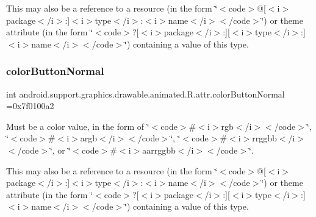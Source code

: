 This may also be a reference to a resource (in the form \char`\"{}$<$code$>$@\mbox{[}$<$i$>$package$<$/i$>$\+:\mbox{]}$<$i$>$type$<$/i$>$\+:$<$i$>$name$<$/i$>$$<$/code$>$\char`\"{}) or theme attribute (in the form \char`\"{}$<$code$>$?\mbox{[}$<$i$>$package$<$/i$>$\+:\mbox{]}\mbox{[}$<$i$>$type$<$/i$>$\+:\mbox{]}$<$i$>$name$<$/i$>$$<$/code$>$\char`\"{}) containing a value of this type. \mbox{\label{classandroid_1_1support_1_1graphics_1_1drawable_1_1animated_1_1R_1_1attr_a2c2682599083668662dd93ec8e0b2240}} 
\subsubsection{\texorpdfstring{color\+Button\+Normal}{colorButtonNormal}}
{\footnotesize\ttfamily int android.\+support.\+graphics.\+drawable.\+animated.\+R.\+attr.\+color\+Button\+Normal =0x7f0100a2\hspace{0.3cm}{\ttfamily [static]}}

Must be a color value, in the form of \char`\"{}$<$code$>$\#$<$i$>$rgb$<$/i$>$$<$/code$>$\char`\"{}, \char`\"{}$<$code$>$\#$<$i$>$argb$<$/i$>$$<$/code$>$\char`\"{}, \char`\"{}$<$code$>$\#$<$i$>$rrggbb$<$/i$>$$<$/code$>$\char`\"{}, or \char`\"{}$<$code$>$\#$<$i$>$aarrggbb$<$/i$>$$<$/code$>$\char`\"{}. 

This may also be a reference to a resource (in the form \char`\"{}$<$code$>$@\mbox{[}$<$i$>$package$<$/i$>$\+:\mbox{]}$<$i$>$type$<$/i$>$\+:$<$i$>$name$<$/i$>$$<$/code$>$\char`\"{}) or theme attribute (in the form \char`\"{}$<$code$>$?\mbox{[}$<$i$>$package$<$/i$>$\+:\mbox{]}\mbox{[}$<$i$>$type$<$/i$>$\+:\mbox{]}$<$i$>$name$<$/i$>$$<$/code$>$\char`\"{}) containing a value of this type. \mbox{\label{classandroid_1_1support_1_1graphics_1_1drawable_1_1animated_1_1R_1_1attr_aaf4ee1c60b7a2eea360943b07ee08f64}} 
